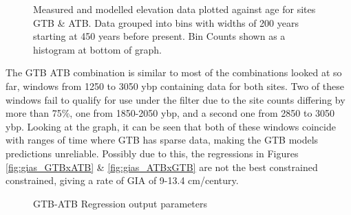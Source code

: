 \begin{figure}[H]
	\caption{Measured and modelled elevation data plotted against age for sites GTB \& ATB. Data grouped into bins with widths of 200 years starting at 450 years before present. Bin Counts shown as a histogram at bottom of graph.}	
	\label{fig:data_GTBxATB}
\end{figure}

The GTB ATB combination is similar to most of the combinations looked at so far,
windows from 1250 to 3050 ybp containing data for both sites. Two of these windows
fail to qualify for use under the filter due to the site counts differing by more
than 75\%, one from 1850-2050 ybp, and a second one from 2850 to 3050 ybp. Looking
at the graph, it can be seen that both of these windows coincide with ranges of
time where GTB has sparse data, making the GTB models predictions unreliable.
Possibly due to this, the
regressions in Figures \ref{fig:gias_GTBxATB} \& \ref{fig:gias_ATBxGTB} are not
the best constrained constrained, giving a rate of GIA of 9-13.4 cm/century. \\

\begin{figure}[H]
	\begin{flushleft}
	\end{flushleft}
	\caption{GTB-ATB Regression output parameters}
	\label{fig:GTBxATB_regression}
\end{figure}

\newpage

